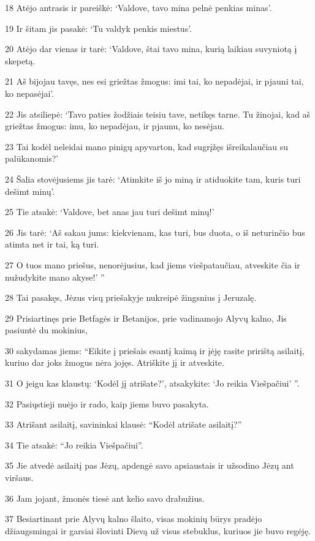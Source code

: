 \par 18 Atėjo antrasis ir pareiškė: ‘Valdove, tavo mina pelnė penkias minas’. 
\par 19 Ir šitam jis pasakė: ‘Tu valdyk penkis miestus’. 
\par 20 Atėjo dar vienas ir tarė: ‘Valdove, štai tavo mina, kurią laikiau suvyniotą į skepetą. 
\par 21 Aš bijojau tavęs, nes esi griežtas žmogus: imi tai, ko nepadėjai, ir pjauni tai, ko nepasėjai’. 
\par 22 Jis atsiliepė: ‘Tavo paties žodžiais teisiu tave, netikęs tarne. Tu žinojai, kad aš griežtas žmogus: imu, ko nepadėjau, ir pjaunu, ko nesėjau. 
\par 23 Tai kodėl neleidai mano pinigų apyvarton, kad sugrįžęs išreikalaučiau su palūkanomis?’ 
\par 24 Šalia stovėjusiems jis tarė: ‘Atimkite iš jo miną ir atiduokite tam, kuris turi dešimt minų’. 
\par 25 Tie atsakė: ‘Valdove, bet anas jau turi dešimt minų!’ 
\par 26 Jis tarė: ‘Aš sakau jums: kiekvienam, kas turi, bus duota, o iš neturinčio bus atimta net ir tai, ką turi. 
\par 27 O tuos mano priešus, nenorėjusius, kad jiems viešpataučiau, atveskite čia ir nužudykite mano akyse!’ ” 
\par 28 Tai pasakęs, Jėzus visų priešakyje nukreipė žingsnius į Jeruzalę. 
\par 29 Prisiartinęs prie Betfagės ir Betanijos, prie vadinamojo Alyvų kalno, Jis pasiuntė du mokinius, 
\par 30 sakydamas jiems: “Eikite į priešais esantį kaimą ir įėję rasite pririštą asilaitį, kuriuo dar joks žmogus nėra jojęs. Atriškite jį ir atveskite. 
\par 31 O jeigu kas klaustų: ‘Kodėl jį atrišate?’, atsakykite: ‘Jo reikia Viešpačiui’ ”. 
\par 32 Pasiųstieji nuėjo ir rado, kaip jiems buvo pasakyta. 
\par 33 Atrišant asilaitį, savininkai klausė: “Kodėl atrišate asilaitį?” 
\par 34 Tie atsakė: “Jo reikia Viešpačiui”. 
\par 35 Jie atvedė asilaitį pas Jėzų, apdengė savo apsiaustais ir užsodino Jėzų ant viršaus. 
\par 36 Jam jojant, žmonės tiesė ant kelio savo drabužius. 
\par 37 Besiartinant prie Alyvų kalno šlaito, visas mokinių būrys pradėjo džiaugsmingai ir garsiai šlovinti Dievą už visus stebuklus, kuriuos jie buvo regėję. 
